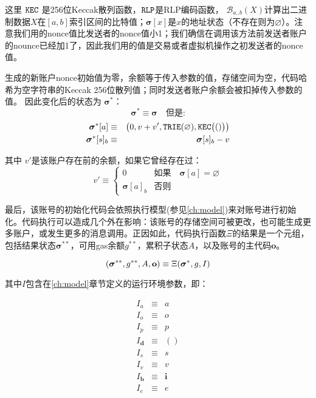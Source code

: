 \documentclass[UTF8,nofonts]{ctexart}
\begin{document}
\begin{multicols}{2}
这里 $\mathtt{\tiny KEC}$ 是256位Keccak散列函数，$\mathtt{\tiny RLP}$是RLP编码函数，
$\mathcal{B}_{a..b}(X)$计算出二进制数据$X$在$[a, b]$索引区间的比特值；$\boldsymbol{\sigma}[x]$是$x$的地址状态（不存在则为$\varnothing$）。注意我们用的nonce值比发送者的nonce值小1；我们确信在调用该方法前发送者账户的nounce已经加1了，因此我们用的值是交易或者虚拟机操作之初发送者的nonce值。

生成的新账户nonce初始值为零，余额等于传入参数的值，存储空间为空，代码哈希为空字符串的Keccak 256位散列值；同时发送者账户余额会被扣掉传入参数的值。 因此变化后的状态为 $\boldsymbol{\sigma}^*$：
\begin{equation}
\boldsymbol{\sigma}^* \equiv \boldsymbol{\sigma} \quad \text{但是:}
\end{equation}
\begin{eqnarray}
\boldsymbol{\sigma}^*[a] &\equiv& \big( 0, v + v', \mathtt{\tiny TRIE}(\varnothing), \mathtt{\tiny KEC}\big(()\big) \big) \\
\boldsymbol{\sigma}^*[s]_b &\equiv& \boldsymbol{\sigma}[s]_b - v
\end{eqnarray}

其中 $v'$是该账户存在前的余额，如果它曾经存在过：
\begin{equation}
v' \equiv \begin{cases}
0 & \text{如果} \quad \boldsymbol{\sigma}[a] = \varnothing\\
\boldsymbol{\sigma}[a]_b & \text{否则}
\end{cases}
\end{equation}


最后，该账号的初始化代码会依照执行模型(参见\ref{ch:model})来对账号进行初始化。代码执行可以造成几个外在影响：该账号的存储空间可被更改，也可能生成更多账户，或发生更多的消息调用。正因如此，代码执行函数$\Xi$的结果是一个元组，包括结果状态$\boldsymbol{\sigma}^{**}$，可用gas余额$g^{**}$，累积子状态$A$，以及账号的主代码$\mathbf{o}$。

\begin{equation}
(\boldsymbol{\sigma}^{**}, g^{**}, A, \mathbf{o}) \equiv \Xi(\boldsymbol{\sigma}^*, g, I) \\
\end{equation}

其中$I$包含在\ref{ch:model}章节定义的运行环境参数，即：

\begin{eqnarray}
I_a & \equiv & a \\
I_o & \equiv & o \\
I_p & \equiv & p \\
I_\mathbf{d} & \equiv & () \\
I_s & \equiv & s \\
I_v & \equiv & v \\
I_\mathbf{b} & \equiv & \mathbf{i} \\
I_e & \equiv & e
\end{eqnarray}


\end{multicols}
\end{document}
